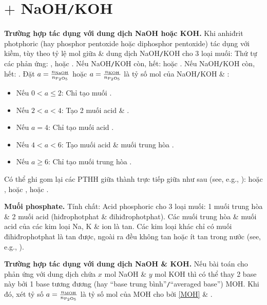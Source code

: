 \documentclass{article}
\begin{document}
\section{ $+$ NaOH{\tt/}KOH}
\noindent\textbf{\textsf{Trường hợp  tác dụng với dung dịch NaOH hoặc KOH.}} Khi anhiđrit photphoric (hay phosphor pentoxide hoặc diphosphor pentoxide)  tác dụng với kiềm, tùy theo tỷ lệ mol giữa  \& dung dịch NaOH{\tt/}KOH cho 3 loại muối: Thứ tự các phản ứng: ,  hoặc . Nếu NaOH{\tt/}KOH còn,  hết:  hoặc . Nếu NaOH{\tt/}KOH còn,  hết: . Đặt $a = \frac{n_{\rm NaOH}}{n_{\ce{P2O5}}}$ hoặc $a = \frac{n_{\rm KOH}}{n_{\ce{P2O5}}}$ là tỷ số mol của NaOH{\tt/}KOH \& :
\begin{itemize}
	\item Nếu $0 < a\le2$: Chỉ tạo muối .
	\item Nếu $2 < a < 4$: Tạo 2 muối acid  \& .
	\item Nếu $a = 4$: Chỉ tạo muối acid .
	\item Nếu $4 < a < 6$: Tạo muối acid  \& muối trung hòa .
	\item Nếu $a\ge6$: Chỉ tạo muối trung hòa .
\end{itemize}
Có thể ghi gom lại các {\rm PTHH} giữa  thành trực tiếp giữa  như sau (see, e.g., \cite[pp. 204--205]{An_chuoi_PUHH}):  hoặc ,  hoặc ,  hoặc .

\textbf{Muối phosphate.} Tính chất: Acid phosphoric  cho 3 loại muối: 1 muối trung hòa \& 2 muối acid (hiđrophotphat \& đihiđrophotphat). Các muối trung hòa \& muối acid của các kim loại Na, K \& ion  là tan. Các kim loại khác chỉ có muối đihiđrophotphat là tan được, ngoài ra đều không tan hoặc ít tan trong nước (see, e.g., \cite[p. 206]{An_chuoi_PUHH}).
\vspace{2mm}

\noindent\textbf{\textsf{Trường hợp  tác dụng với dung dịch NaOH \& KOH.}} Nếu bài toán cho  phản ứng với dung dịch chứa $x$ mol NaOH \& $y$ mol KOH thì có thể thay 2 base này bởi 1 base tương đương (hay ``base trung bình''{\tt/}``averaged base'') MOH. Khi đó, xét tỷ số $a = \frac{n_{\rm MOH}}{n_{\ce{P2O5}}}$ là tỷ số mol của MOH cho bởi \eqref{MOH} \& .
\end{document}
